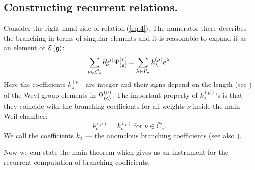 \documentclass[12pt]{iopart}
\theoremstyle{definition}
\newcommand{\af}{\mathfrak{a}}
\begin{document}
\subsection{Constructing recurrent relations.}
\label{subsec:Construct-recurrent-rel}

Consider the right-hand side of relation (\ref{eq:4}).
The numerator there describes the branching in terms of singular elements and
it is reasonable to expand it as an element of $\mathcal{E}\left( \frak{g} \right)$:
\begin{equation}
  \label{eq:21}
  \sum_{\nu \in \bar{C_{\mathfrak{a}}}}b_{\nu }^{\left( \mu \right) }\Psi _{\left( \frak{%
        a}\right) }^{\left( \nu \right) }=\sum_{\lambda \in P_{\af}}k_{\lambda
  }^{\left( \mu \right) }e^{\lambda }.
\end{equation}
Here the coefficients $k_{\lambda}^{\left( \mu \right) }$ are integer and their signs
depend on the length (see \cite{humphreys1997introduction})  of the Weyl group elements in
$\Psi _{\left( \frak{a}\right) }^{\left( \nu \right) }$. The important property of
$k_{\lambda}^{\left( \mu \right) }$'s is that they coincide with the branching coefficients
for all weights $\nu$ inside the main Weil chamber:
\begin{equation}
  b^{(\mu)}_{\nu}=k^{(\mu)}_{\nu} \; \mbox{for} \; \nu\in \bar{C}_{\mathfrak{a}}.
\label{eq:21-1}
\end{equation}
We call the coefficients $k_{\lambda}$ --- the anomalous branching coefficients
(see also \cite{ilyin812pbc}).

Now we can state the main theorem which gives us an instrument for the
recurrent computation of branching coefficients.
\end{document}
